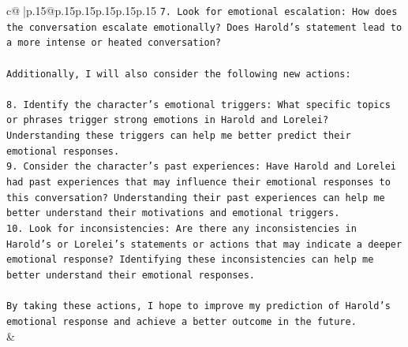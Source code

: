 \documentclass{article}
\begin{document}
{\begin{supertabular}{c@{$\;$}|p{.15\linewidth}@{}p{.15\linewidth}p{.15\linewidth}p{.15\linewidth}p{.15\linewidth}p{.15\linewidth}}
{{{\texttt{7. Look for emotional escalation: How does the conversation escalate emotionally? Does Harold's statement lead to a more intense or heated conversation?} \\
\\ 
\texttt{Additionally, I will also consider the following new actions:} \\
\\ 
\texttt{8. Identify the character's emotional triggers: What specific topics or phrases trigger strong emotions in Harold and Lorelei? Understanding these triggers can help me better predict their emotional responses.} \\
\texttt{9. Consider the character's past experiences: Have Harold and Lorelei had past experiences that may influence their emotional responses to this conversation? Understanding their past experiences can help me better understand their motivations and emotional triggers.} \\
\texttt{10. Look for inconsistencies: Are there any inconsistencies in Harold's or Lorelei's statements or actions that may indicate a deeper emotional response? Identifying these inconsistencies can help me better understand their emotional responses.} \\
\\ 
\texttt{By taking these actions, I hope to improve my prediction of Harold's emotional response and achieve a better outcome in the future.} \\
            }
        }
    }
    & \\ \\

\end{supertabular}
}
\end{document}
